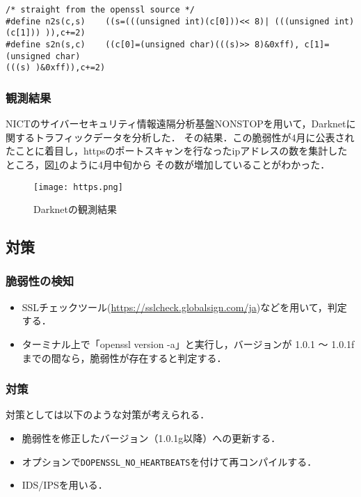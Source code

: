 \begin{verbatim}
/* straight from the openssl source */
#define n2s(c,s)    ((s=(((unsigned int)(c[0]))<< 8)| (((unsigned int)(c[1])) )),c+=2)
#define s2n(s,c)    ((c[0]=(unsigned char)(((s)>> 8)&0xff), c[1]=(unsigned char)
(((s) )&0xff)),c+=2)
\end{verbatim}

\subsubsection{観測結果}
NICTのサイバーセキュリティ情報遠隔分析基盤NONSTOPを用いて，Darknetに関するトラフィックデータを分析した．
その結果．この脆弱性が4月に公表されたことに着目し，httpsのポートスキャンを行なったipアドレスの数を集計したところ，図\ref{fig:https}のように4月中旬から
その数が増加していることがわかった．

\begin{figure}[htbp]
  \centering
    \texttt{[image: https.png]}
    \caption{Darknetの観測結果}
  \label{fig:https}
\end{figure}


\subsection{対策}
\subsubsection{脆弱性の検知}
\begin{itemize}
\item SSLチェックツール(\url{https://sslcheck.globalsign.com/ja})\cite{check}などを用いて，判定する．
\item ターミナル上で「openssl version -a」と実行し，バージョンが 1.0.1 〜 1.0.1fまでの間なら，脆弱性が存在すると判定する．
\end{itemize}


\subsubsection{対策}
対策としては以下のような対策が考えられる．
\begin{itemize}
\item 脆弱性を修正したバージョン（1.0.1g以降）への更新する．
\item オプションで\verb|DOPENSSL_NO_HEARTBEATS|を付けて再コンパイルする．
\item IDS/IPSを用いる．
\end{itemize}

